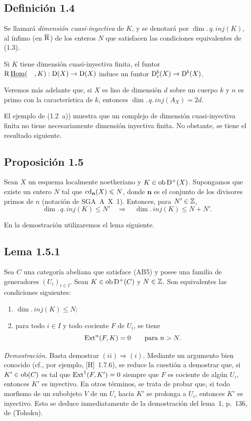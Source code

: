 \subsection*{Definición 1.4}
Se llamará \emph{dimensión cuasi-inyectiva} de $K$, y se denotará por $\dim.\,q.\,inj(K)$, al ínfimo (en $\overline{\mathrm{R}}$) de los enteros $N$ que satisfacen las condiciones equivalentes de (1.3).

Si $K$ tiene dimensión cuasi-inyectiva finita, el funtor $\mathrm{R}\,\underline{\operatorname{Hom}}(\quad,K) : \mathrm{D}(X) \to \mathrm{D}(X)$ induce un funtor $\mathrm{D}_c^{b}(X) \to \mathrm{D}^{b}(X)$.

Veremos más adelante que, si $X$ es liso de dimensión $d$ sobre un cuerpo $k$ y $n$ es primo con la característica de $k$, entonces $\dim.\,q.\,inj(A_X) = 2d$.

El ejemplo de (1.2~a)) muestra que un complejo de dimensión cuasi-inyectiva finita no tiene necesariamente dimensión inyectiva finita. No obstante, se tiene el resultado siguiente.

\subsection*{Proposición 1.5}
Sean $X$ un esquema localmente noetheriano y $K \in \operatorname{ob} \mathrm{D}^{+}(X)$. Supongamos que existe un entero $N$ tal que $\operatorname{cd}_{\mathbf{n}}(X) \leqslant N$, donde $\mathbf{n}$ es el conjunto de los divisores primos de $n$ (notación de SGA~A~X~1). Entonces, para $N' \in \mathbb{Z}$,
\[
\dim.\,q.\,inj(K) \leqslant N' \quad \Longrightarrow \quad \dim.\,inj(K) \leqslant N + N'.
\]

En la demostración utilizaremos el lema siguiente.

\subsection*{Lema 1.5.1}
Sea $C$ una categoría abeliana que satisface (AB5) y posee una familia de generadores $(U_i)_{i \in I}$. Sean $K \in \operatorname{ob} \mathrm{D}^{+}(C)$ y $N \in \mathbb{Z}$. Son equivalentes las condiciones siguientes:
\begin{enumerate}[label=(\roman*)]
\item $\dim.\,inj(K) \leqslant N$;
\item para todo $i \in I$ y todo cociente $F$ de $U_i$, se tiene
\[
\operatorname{Ext}^n(F,K) = 0 \qquad \text{para } n > N.
\]
\end{enumerate}

\emph{Demostración.} Basta demostrar $(ii) \Rightarrow (i)$. Mediante un argumento bien conocido (cf., por ejemplo, [H]~1.7.6), se reduce la cuestión a demostrar que, si $K' \in \operatorname{ob}(C)$ es tal que $\operatorname{Ext}^1(F,K') = 0$ siempre que $F$ es cociente de algún $U_i$, entonces $K'$ es inyectivo. En otros términos, se trata de probar que, si todo morfismo de un subobjeto $V$ de un $U_i$ hacia $K'$ se prolonga a $U_i$, entonces $K'$ es inyectivo. Esto se deduce inmediatamente de la demostración del lema~1, p.~136, de (Tohoku).

